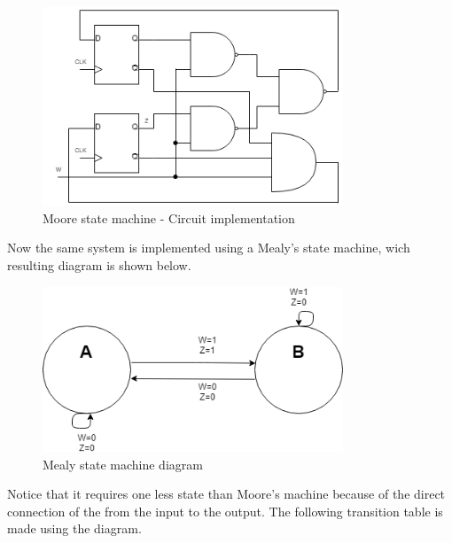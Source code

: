\begin{figure}[H]
    \begin{centering}
    \includegraphics[width=0.8\textwidth]{Graficos3/3a_Compuertas_Moore.png}
    \par\end{centering}
    \caption{Moore state machine - Circuit implementation}
\end{figure}

Now the same system is implemented using a Mealy's 
state machine, wich resulting diagram is shown below.

\begin{figure}[H]
    \begin{centering}
    \includegraphics[width=0.8\textwidth]{Graficos3/3b_fsm.png}
    \par\end{centering}
    \caption{Mealy state machine diagram}
\end{figure}

Notice that it requires one less state than Moore's
machine because of the direct connection of the 
from the input to the output. 
\newpage
The following 
transition table is made using the diagram.

